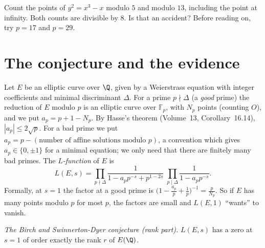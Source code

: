 \begin{think}
Count the points of $y^2=x^3-x$ modulo $5$ and modulo $13$, including the point at infinity. Both counts are divisible by $8$. Is that an accident? Before
reading on, try $p=17$ and $p=29$.
\end{think}

\section{The conjecture and the evidence}

Let $E$ be an elliptic curve over $\Q$, given by a Weierstrass equation with integer coefficients and minimal discriminant $\Delta$. For a prime $p\nmid\Delta$
(a \emph{good} prime) the reduction of $E$ modulo $p$ is an elliptic curve over $\mathbb F_p$, with $N_p$ points (counting $O$), and we put $a_p=p+1-N_p$. By
Hasse's theorem (Volume~13, Corollary~16.14), $|a_p|\le2\sqrt p$. For a bad prime we put $a_p=p-(\text{number of affine solutions modulo }p)$, a convention
which gives $a_p\in\{0,\pm1\}$ for a minimal equation; we only need that there are finitely many bad primes. The \emph{$L$-function} of $E$ is
\[
L(E,s)=\prod_{p\nmid\Delta}\frac1{1-a_pp^{-s}+p^{1-2s}}\;\prod_{p\mid\Delta}\frac1{1-a_pp^{-s}}.
\]
Formally, at $s=1$ the factor at a good prime is $\bigl(1-\frac{a_p}p+\frac1p\bigr)^{-1}=\frac p{N_p}$. So if $E$ has many points modulo $p$ for most $p$, the
factors are small and $L(E,1)$ ``wants'' to vanish.

\begin{center}
\emph{The Birch and Swinnerton-Dyer conjecture (rank part).} $L(E,s)$ has a zero at $s=1$ of order exactly the rank $r$ of $E(\Q)$.
\end{center}


